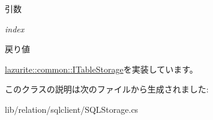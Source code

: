 \begin{DoxyParams}{引数}
\item[{\em index}]\end{DoxyParams}
\begin{DoxyReturn}{戻り値}

\end{DoxyReturn}


\hyperlink{interfacelazurite_1_1common_1_1_i_table_storage_adba59c2b0bb2d632fbc2ae087b6b63f3}{lazurite::common::ITableStorage}を実装しています。

このクラスの説明は次のファイルから生成されました:\begin{DoxyCompactItemize}
\item 
lib/relation/sqlclient/SQLStorage.cs\end{DoxyCompactItemize}
